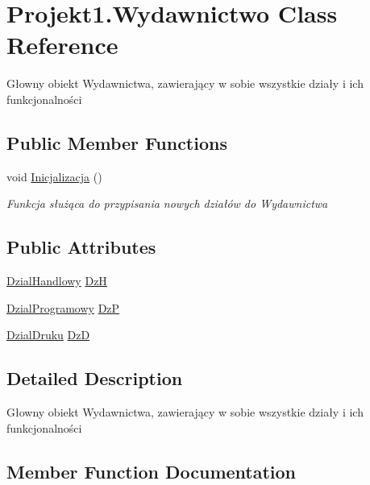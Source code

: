 \hypertarget{class_projekt1_1_1_wydawnictwo}{}\section{Projekt1.\+Wydawnictwo Class Reference}
\label{class_projekt1_1_1_wydawnictwo}


Głowny obiekt Wydawnictwa, zawierający w sobie wszystkie działy i ich funkcjonalności  


\subsection*{Public Member Functions}
\begin{DoxyCompactItemize}
\item 
void \mbox{\hyperlink{class_projekt1_1_1_wydawnictwo_a5831651945cb56c52d8619a3167693ce}{Inicjalizacja}} ()
\begin{DoxyCompactList}\small\item\em Funkcja służąca do przypisania nowych działów do Wydawnictwa \end{DoxyCompactList}\end{DoxyCompactItemize}
\subsection*{Public Attributes}
\begin{DoxyCompactItemize}
\item 
\mbox{\hyperlink{class_projekt1_1_1_dzial_handlowy}{Dzial\+Handlowy}} \mbox{\hyperlink{class_projekt1_1_1_wydawnictwo_a545a5aa060825866a59e9bbd3183b119}{DzH}}
\item 
\mbox{\hyperlink{class_projekt1_1_1_dzial_programowy}{Dzial\+Programowy}} \mbox{\hyperlink{class_projekt1_1_1_wydawnictwo_aa278517d1ce41396caf9a5f49efc39df}{DzP}}
\item 
\mbox{\hyperlink{class_projekt1_1_1_dzial_druku}{Dzial\+Druku}} \mbox{\hyperlink{class_projekt1_1_1_wydawnictwo_aa39e9dd77e7dcb3909f325a25a081e2b}{DzD}}
\end{DoxyCompactItemize}


\subsection{Detailed Description}
Głowny obiekt Wydawnictwa, zawierający w sobie wszystkie działy i ich funkcjonalności 



\subsection{Member Function Documentation}
\mbox{\label{class_projekt1_1_1_wydawnictwo_a5831651945cb56c52d8619a3167693ce}} 
